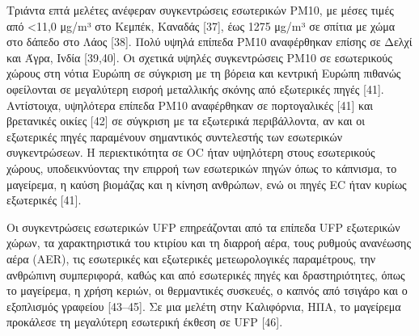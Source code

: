 Τριάντα επτά μελέτες ανέφεραν συγκεντρώσεις εσωτερικών PM10, με μέσες τιμές από <11,0 μg/m³ στο Κεμπέκ, Καναδάς [37], έως 1275 μg/m³ σε σπίτια με χώμα στο δάπεδο στο Λάος [38]. Πολύ υψηλά επίπεδα PM10 αναφέρθηκαν επίσης σε Δελχί και Άγρα, Ινδία [39,40]. Οι σχετικά υψηλές συγκεντρώσεις PM10 σε εσωτερικούς χώρους στη νότια Ευρώπη σε σύγκριση με τη βόρεια και κεντρική Ευρώπη πιθανώς οφείλονται σε μεγαλύτερη εισροή μεταλλικής σκόνης από εξωτερικές πηγές [41]. Αντίστοιχα, υψηλότερα επίπεδα PM10 αναφέρθηκαν σε πορτογαλικές [41] και βρετανικές οικίες [42] σε σύγκριση με τα εξωτερικά περιβάλλοντα, αν και οι εξωτερικές πηγές παραμένουν σημαντικός συντελεστής των εσωτερικών συγκεντρώσεων. Η περιεκτικότητα σε OC ήταν υψηλότερη στους εσωτερικούς χώρους, υποδεικνύοντας την επιρροή των εσωτερικών πηγών όπως το κάπνισμα, το μαγείρεμα, η καύση βιομάζας και η κίνηση ανθρώπων, ενώ οι πηγές EC ήταν κυρίως εξωτερικές [41].

Οι συγκεντρώσεις εσωτερικών UFP επηρεάζονται από τα επίπεδα UFP εξωτερικών χώρων, τα χαρακτηριστικά του κτιρίου και τη διαρροή αέρα, τους ρυθμούς ανανέωσης αέρα (AER), τις εσωτερικές και εξωτερικές μετεωρολογικές παραμέτρους, την ανθρώπινη συμπεριφορά, καθώς και από εσωτερικές πηγές και δραστηριότητες, όπως το μαγείρεμα, η χρήση κεριών, οι θερμαντικές συσκευές, ο καπνός από τσιγάρο και ο εξοπλισμός γραφείου [43–45]. Σε μια μελέτη στην Καλιφόρνια, ΗΠΑ, το μαγείρεμα προκάλεσε τη μεγαλύτερη εσωτερική έκθεση σε UFP [46].

